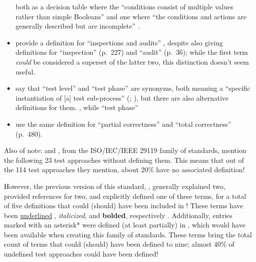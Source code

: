 \begin{itemize}
            both as a decision table where the ``conditions consist of multiple
            values rather than simple Booleans'' \citeyearpar[p.~18]{IEEE2021}
            and one where ``the conditions and actions are generally described
            but are incomplete'' \citeyearpar[p.~175]{IEEE2017}.
      \item \citeauthor*{IEEE2017} provide a definition for ``inspections and
            audits'' \citeyearpar[p.~228]{IEEE2017}, despite also giving
            definitions for ``inspection'' (p.~227) and ``audit'' (p.~36);
            while the first term \emph{could} be considered a superset of the
            latter two, this distinction doesn't seem useful.
      \item \citeauthor*{IEEE2017} say that ``test level'' and ``test phase''
            are synonyms, both meaning a ``specific instantiation of [a] test
            sub-process'' (\citeyear[pp.~469,~470]{IEEE2017};
            \citeyear[p.~9]{IEEE2013}), but there are also alternative
            definitions for them. \procLevel{\citeyearpar}, while
            ``test phase'' \phaseDef{}
      \item \citeauthor{IEEE2017} use the same definition for ``partial correctness''
            \citeyearpar[p.~314]{IEEE2017} and ``total correctness'' (p.~480).
            \fi
\end{itemize}

\ifnotpaper
      Also of note: \citep{IEEE2022} and \citeyearpar{IEEE2021}, from the
      ISO/IEC/IEEE 29119 family of standards, mention the following 23 test
      approaches without defining them. This means that out of the 114 test
      approaches they mention, about 20\% have no associated definition!

      However, the previous version of this standard, \citeyearpar{IEEE2013},
      generally explained two, provided references for two, and explicitly defined
      one of these terms, for a total of five definitions that could (should) have
      been included in \citeyearpar{IEEE2022}! These terms have been
      \underline{underlined}\ifnotpaper%
            , \emph{italicized}, and \textbf{bolded}, respectively%
      \fi. Additionally, entries marked with an asterisk* were defined (at least
      partially) in \citeyearpar{IEEE2017}, which would have been available when
      creating this family of standards. These terms bring the total count of terms
      that could (should) have been defined to nine; almost 40\% of undefined test
      approaches could have been defined!

